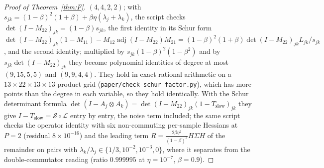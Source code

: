 \documentclass[11pt]{article}
\theoremstyle{remark}
\begin{document}
\begin{proof}[Proof of Theorem~\ref{thm:F}]
$(4,4,2,2)$; with $s_{jk}=(1-\beta)^2(1+\beta)+\beta\eta(\lambda_j+\lambda_k)$, the script checks $\det(I-M_{22})_{jk}=(1-\beta)s_{jk}$, the first identity in its Schur form $\det(I-M_{22})_{jk}(1-M_{11})-M_{12}\operatorname{adj}(I-M_{22})M_{21}=(1-\beta)^2(1+\beta)\det(I-M_{22})_{jk}L_{jk}/s_{jk}$, and the second identity; multiplied by $s_{jk}(1-\beta)^2(1-\beta^2)$ and by $s_{jk}\det(I-M_{22})_{jk}$ they become polynomial identities of degree at most $(9,15,5,5)$ and $(9,9,4,4)$. They hold in exact rational arithmetic on a $13\times22\times13\times13$ product grid (\texttt{paper/check-schur-factor.py}), which has more points than the degree in each variable, so they hold identically. With the Schur determinant formula $\det(I-A_j\otimes A_k)=\det(I-M_{22})_{jk}(1-T_{\mathrm{slow}})_{jk}$ they give $I-T_{\mathrm{slow}}=\mathcal S\circ\mathcal L$ entry by entry, the noise term included; the same script checks the operator identity with six non-commuting per-sample Hessians at $P=2$ (residual $8\times10^{-16}$) and the leading term $R=\frac{2\beta\eta^2}{(1-\beta)^3}H\Sigma H$ of the remainder on pairs with $\lambda_k/\lambda_j\in\{1/3,10^{-2},10^{-3},0\}$, where it separates from the double-commutator reading (ratio $0.999995$ at $\eta=10^{-7}$, $\beta=0.9$). \end{proof}
\end{document}
